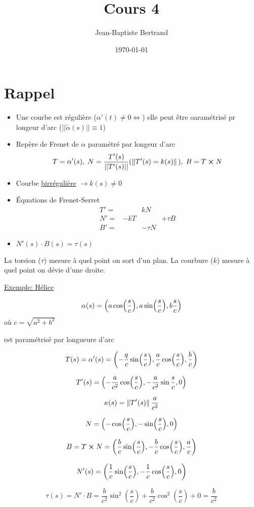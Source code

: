 \documentclass{article}
\title{Cours 4}
\author{Jean-Baptiste Bertrand}
\date{\today}
\begin{document}
\maketitle

\section*{Rappel}

\begin{itemize}
	\item Une courbe est régulière ($\alpha'(t)\neq 0 \iff $) elle peut être oaramétrisé pr longeur d'arc ($||\tilde\alpha(s)|| \equiv 1$)
	\item Repère de Frenet de $\alpha$ paramétré par longeur d'arc $$T = \alpha'(s),\; N = \frac{T'(s)}{||T'(s)||} (\norm*{T'(s) = k(s)}),\; B=T\cross N$$
	\item Courbe \underline{birrégulière} $\to k(s)\neq 0$
	\item Équations de Frenet-Serret $$\begin{matrix}T' = && kN &\\ N' = &-kT& &+\tau B\\ B' = & &-\tau N &\end{matrix}$$
	\item $N'(s)\cdot B(s) =\tau(s)$
\end{itemize}


La torsion ($\tau$) mesure à quel point on sort d'un plan. La courbure ($k$) mesure à quel point on dévie d'une droite.

\underline{Exemple: Hélice}

$$\alpha(s) = \qty(a\cos(\frac sc), a\sin(\frac sc), b\frac sc)$$ où $c = \sqrt{a^2 + b^2}$

est paramétrisé par longueure d'arc

$$T(s)= \alpha'(s) = \qty(-\frac qc \sin(\frac s c), \frac ac\cos(\frac sc), \frac bc)$$

$$T'(s) = \qty(-\frac{a}{c^2}\cos(\frac sc), -\frac{a}{c^2}\sin{\frac sc}, 0)$$

$$\kappa(s) = \norm*{T'(s)} \frac{a}{c^2}$$

$$N = \qty(-\cos(\frac sc), -\sin(\frac sc),0)$$

$$B = T \cross N = \qty(\frac bc \sin(\frac sc), -\frac bc\cos(\frac sc), \frac ac)$$

$$N'(s)= \qty(\frac 1c\sin(\frac sc),-\frac 1c\cos(\frac sc), 0)$$

$$\tau(s)= N'\cdot B = \frac{b}{c^2}\sin^2(\frac sc)+ \frac{b}{c^2}\cos^2(\frac sc)+0 = \frac{b}{c^2}$$
\end{document}
